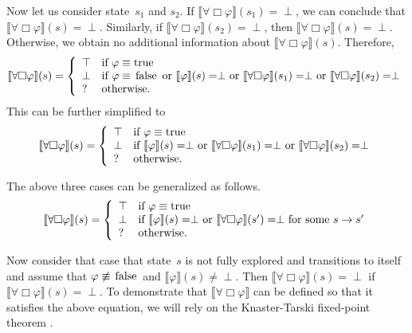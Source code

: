 \documentclass[12pt]{article}
\newcommand{\always}{\Box}
\newcommand{\TRUE}{\mbox{\lstinline{true}}}
\newcommand{\FALSE}{\mbox{\lstinline{false}}}
\theoremstyle{definition}
\newcommand{\satisfaction}[1]{\llbracket #1 \rrbracket}
\begin{document}
\begin{itemize}
Now let us consider state~$s_1$ and $s_2$.  If $\satisfaction{\forall \always \varphi}(s_1) = \perp$, we can conclude that $\satisfaction{\forall \always \varphi}(s) = \perp$.  Similarly, if $\satisfaction{\forall \always \varphi}(s_2) = \perp$, then $\satisfaction{\forall \always \varphi}(s) = \perp$.  Otherwise, we obtain no additional information about $\satisfaction{\forall \always \varphi}(s)$.  Therefore,
\[
\satisfaction{\forall \always \varphi}(s) = \left \{
\begin{array}{ll}
\top & \mbox{if $\varphi \equiv \TRUE$}\\
\perp & \mbox{if $\varphi \equiv \FALSE$ or $\satisfaction{\varphi}(s) = \perp$ or $\satisfaction{\forall \always \varphi}(s_1) = \perp$ or $\satisfaction{\forall \always \varphi}(s_2) = \perp$}\\
? & \mbox{otherwise.}
\end{array}
\right .
\]
This can be further simplified to
\[
\satisfaction{\forall \always \varphi}(s) = \left \{
\begin{array}{ll}
\top & \mbox{if $\varphi \equiv \TRUE$}\\
\perp & \mbox{if $\satisfaction{\varphi}(s) = \perp$ or $\satisfaction{\forall \always \varphi}(s_1) = \perp$ or $\satisfaction{\forall \always \varphi}(s_2) = \perp$}\\
? & \mbox{otherwise.}
\end{array}
\right .
\]
\end{itemize}
The above three cases can be generalized as follows.
\[
\satisfaction{\forall \always \varphi}(s) = \left \{
\begin{array}{ll}
\top & \mbox{if $\varphi \equiv \TRUE$}\\
\perp & \mbox{if $\satisfaction{\varphi}(s) = \perp$ or $\satisfaction{\forall \always \varphi}(s') = \perp$ for some $s \rightarrow s'$}\\
? & \mbox{otherwise.}
\end{array}
\right .
\]

Now consider that case that state~$s$ is not fully explored and transitions to itself and assume that $\varphi \not\equiv \FALSE$ and $\satisfaction{\varphi}(s) \not= \perp$.  Then $\satisfaction{\forall \always \varphi}(s) = \perp$ if $\satisfaction{\forall \always \varphi}(s) = \perp$.  To demonstrate that $\satisfaction{\forall \always \varphi}$ can be defined so that it satisfies the above equation, we will rely on the Knaster-Tarski fixed-point theorem \cite{K28,T55}.
\end{document}

